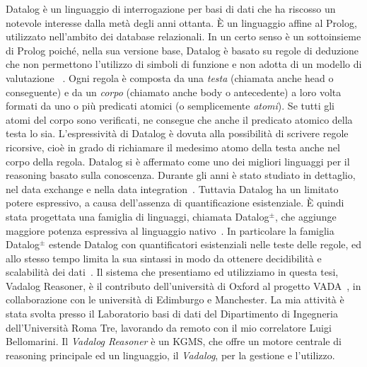 Datalog è un linguaggio di interrogazione per basi di dati che ha riscosso un notevole interesse dalla metà degli anni ottanta. È un linguaggio affine al Prolog, utilizzato nell'ambito dei database relazionali. In un certo senso è un sottoinsieme di Prolog poiché, nella sua versione base, Datalog è basato su regole di deduzione che non permettono l'utilizzo di simboli di funzione e non adotta di un modello di valutazione~\cite{atzeni2006basi} . \newline
Ogni regola è composta da una \emph{testa} (chiamata anche head o conseguente) e da un \emph{corpo} (chiamato anche body o antecedente) a loro volta formati da uno o più predicati atomici (o semplicemente \emph{atomi}). Se tutti gli atomi del corpo sono verificati, ne consegue che anche il predicato atomico della testa lo sia. L'espressività di Datalog è dovuta alla possibilità di scrivere regole ricorsive, cioè in grado di richiamare il medesimo atomo della testa anche nel corpo della regola. \newline
Datalog si è affermato come uno dei migliori linguaggi per il reasoning basato sulla conoscenza. Durante gli anni è stato studiato in dettaglio, nel data exchange e nella data integration~\cite{furche2016data}. \newline
Tuttavia Datalog ha un limitato potere espressivo, a causa dell'assenza di quantificazione esistenziale. È quindi stata progettata una famiglia di linguaggi, chiamata Datalog$^\pm$, che aggiunge maggiore potenza espressiva al linguaggio nativo~\cite{bellomarini2017swift}. \newline 
In particolare la famiglia Datalog$^\pm$ estende Datalog con quantificatori esistenziali nelle teste delle regole, ed allo stesso tempo limita la sua sintassi in modo da ottenere decidibilità e scalabilità dei dati~\cite{cali2013taming,cali2012towards,cali2010datalog+}.  \newline \newline
Il sistema che presentiamo ed utilizziamo in questa tesi, Vadalog Reasoner, è il contributo dell'università di Oxford al progetto VADA~\cite{VADA}, in collaborazione con le università di Edimburgo e Manchester. La mia attività è stata svolta presso il Laboratorio basi di dati del Dipartimento di Ingegneria dell'Università Roma Tre, lavorando da remoto con il mio correlatore Luigi Bellomarini. \newline
Il \emph{Vadalog Reasoner} è un KGMS, che offre un motore centrale di reasoning principale ed un linguaggio, il \emph{Vadalog}, per la gestione e l'utilizzo. \newline
